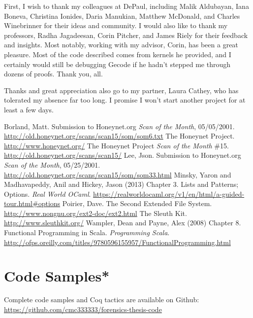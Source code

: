 \documentclass[nocopyrightspace]{sigplanconf}
\begin{document}
\acks
First, I wish to thank my colleagues at DePaul, including Malik Aldubayan,
Iana Boneva, Christina Ionides, Daria Manukian, Matthew McDonald, and Charles
Winebrinner for their ideas and community. I would also like to thank my
professors, Radha Jagadeesan, Corin Pitcher, and James Riely for their
feedback and insights. Most notably, working with my advisor, Corin, has been
a great pleasure. Most of the code described comes from kernels he provided,
and I certainly would still be debugging Gecode if he hadn't stepped me
through dozens of proofs. Thank you, all.

Thanks and great appreciation also go to my partner, Laura Cathey, who has
tolerated my absence far too long. I promise I won't start another project for
at least a few days.





\begin{thebibliography}{}
\softraggedright

  Borland, Matt. Submission to Honeynet.org \emph{Scan of the Month},
  05/05/2001. \url{http://old.honeynet.org/scans/scan15/som/som6.txt}
  The Honeynet Project. \url{http://www.honeynet.org/}
  The Honeynet Project \emph{Scan of the Month} \#15.
  \url{http://old.honeynet.org/scans/scan15/}
  Lee, Json. Submission to Honeynet.org \emph{Scan of the Month}, 05/25/2001.
  \url{http://old.honeynet.org/scans/scan15/som/som33.html}
  Minsky, Yaron and Madhavapeddy, Anil and Hickey, Jason (2013) Chapter 3.
  Lists and Patterns; Options. {\em Real World OCaml}.
  \url{https://realworldocaml.org/v1/en/html/a-guided-tour.html#options}
  Poirier, Dave. The Second Extended File System.
  \url{http://www.nongnu.org/ext2-doc/ext2.html}
  The Sleuth Kit. \url{http://www.sleuthkit.org/}
  Wampler, Dean and Payne, Alex (2008) Chapter 8. Functional Programming in
  Scala. {\em Programming Scala}. 
  \url{http://ofps.oreilly.com/titles/9780596155957/FunctionalProgramming.html}

\end{thebibliography}

\appendix

\section{Code Samples*}
Complete code samples and Coq tactics are available on Github:
\url{https://github.com/cmc333333/forensics-thesis-code}
\end{document}
